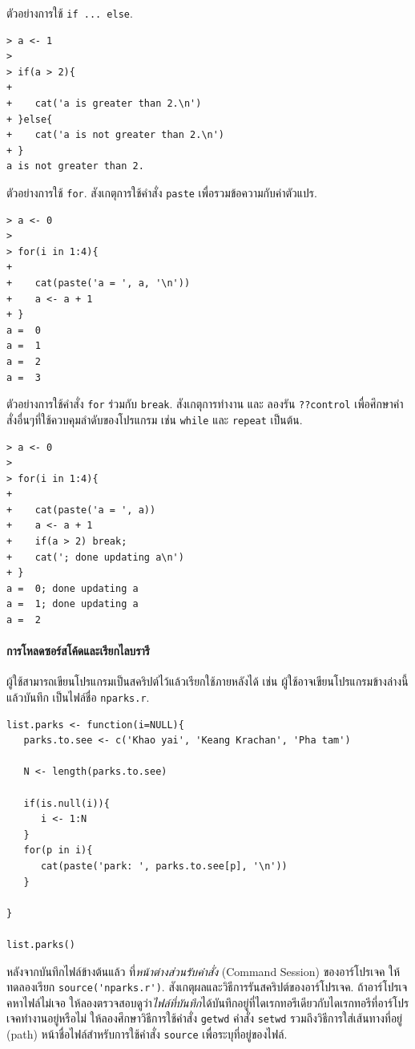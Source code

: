 ตัวอย่างการใช้ \verb|if ... else|.
\begin{verbatim}
> a <- 1
> 
> if(a > 2){
+ 
+    cat('a is greater than 2.\n')
+ }else{
+    cat('a is not greater than 2.\n')
+ }
a is not greater than 2.
\end{verbatim}

ตัวอย่างการใช้ \verb|for|.
สังเกตุการใช้คำสั่ง \texttt{paste} เพื่อรวมข้อความกับค่าตัวแปร.

\begin{verbatim}
> a <- 0
> 
> for(i in 1:4){
+ 
+    cat(paste('a = ', a, '\n'))
+    a <- a + 1
+ }
a =  0 
a =  1 
a =  2 
a =  3 
\end{verbatim}

ตัวอย่างการใช้คำสั่ง \verb|for| ร่วมกับ \verb|break|. 
สังเกตุการทำงาน และ ลองรัน \verb|??control| เพื่อศึกษาคำสั่งอื่นๆที่ใช้ควบคุมลำดับของโปรแกรม เช่น \verb|while| และ \verb|repeat| เป็นต้น.

\begin{verbatim}
> a <- 0
> 
> for(i in 1:4){
+ 
+    cat(paste('a = ', a))
+    a <- a + 1
+    if(a > 2) break;
+    cat('; done updating a\n')
+ }
a =  0; done updating a
a =  1; done updating a
a =  2
\end{verbatim}

\paragraph{การโหลดซอร์สโค้ดและเรียกไลบรารี}
ผู้ใช้สามารถเขียนโปรแกรมเป็นสคริปต์ไว้แล้วเรียกใช้ภายหลังได้ %
เช่น ผู้ใช้อาจเขียนโปรแกรมข้างล่างนี้แล้วบันทึก เป็นไฟล์ชื่อ \verb|nparks.r|.

\begin{verbatim}
list.parks <- function(i=NULL){
   parks.to.see <- c('Khao yai', 'Keang Krachan', 'Pha tam')

   N <- length(parks.to.see)

   if(is.null(i)){
      i <- 1:N
   }
   for(p in i){
      cat(paste('park: ', parks.to.see[p], '\n'))
   }

}

list.parks()
\end{verbatim}

หลังจากบันทึกไฟล์ข้างต้นแล้ว ที่\textit{หน้าต่างส่วนรับคำสั่ง} (Command Session) ของอาร์โปรเจค 
ให้ทดลองเรียก \verb|source('nparks.r')|. 
สังเกตุผลและวิธีการรันสคริปต์ของอาร์โปรเจค.
ถ้าอาร์โปรเจคหาไฟล์ไม่เจอ ให้ลองตรวจสอบดูว่า\textit{ไฟล์ที่บันทึก}ได้บันทึกอยู่ที่ไดเรกทอรีเดียวกับไดเรกทอรีที่อาร์โปรเจคทำงานอยู่หรือไม่
ให้ลองศึกษาวิธีการใช้คำสั่ง \verb|getwd| คำสั่ง \verb|setwd| รวมถึงวิธีการใส่เส้นทางที่อยู่ (path) %
หน้าชื่อไฟล์สำหรับการใช้คำสั่ง \verb|source| เพื่อระบุที่อยู่ของไฟล์.

